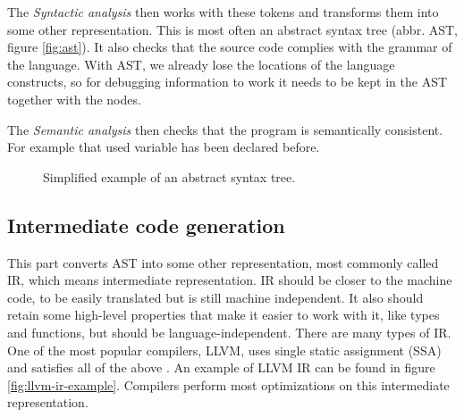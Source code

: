 The \textit{Syntactic analysis} then works with these tokens and transforms
them into some other representation. This is most often an abstract syntax tree
(abbr. AST, figure \ref{fig:ast}). It also checks that the source code complies
with the grammar of the language. With AST, we already lose the locations
of the language constructs, so for debugging information to work it needs
to be kept in the AST together with the nodes.

The \textit{Semantic analysis} then checks that the program is semantically
consistent. For example that used variable has been declared before.

\begin{figure}\label{fig:ast}
    \centering
    \caption{Simplified example of an abstract syntax tree.}
    \label{fig:astgraph}
\end{figure}
 
\subsection{Intermediate code generation}
This part converts AST into some other representation, most commonly called IR,
which means intermediate representation. IR should be closer to the machine
code, to be easily translated but is still machine independent. It also should
retain some high-level properties that make it easier to work with it, like
types and functions, but should be language-independent. There are many types
of IR. One of the most popular compilers, LLVM, uses single static assignment
(SSA) and satisfies all of the above \cite{llvm}. An example of LLVM IR can be
found in figure \ref{fig:llvm-ir-example}. Compilers perform most optimizations
on this intermediate representation. 

